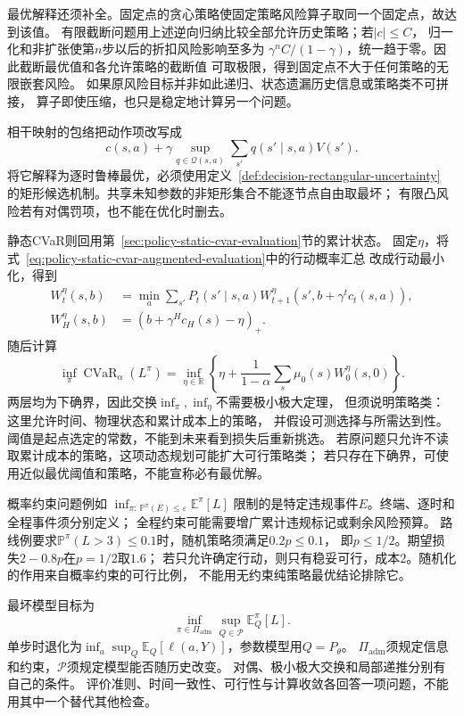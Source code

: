 最优解释还须补全。固定点的贪心策略使固定策略风险算子取同一个固定点，故达到该值。
有限截断问题用上述逆向归纳比较全部允许历史策略；若$|c|\leq C$，
归一化和非扩张使第$n$步以后的折扣风险影响至多为
$\gamma^nC/(1-\gamma)$，统一趋于零。因此截断最优值和各允许策略的截断值
可取极限，得到固定点不大于任何策略的无限嵌套风险。
如果原风险目标并非如此递归、状态遗漏历史信息或策略类不可拼接，
算子即使压缩，也只是稳定地计算另一个问题。

相干映射的包络把动作项改写成
\[
  c(s,a)+\gamma\sup_{q\in\mathcal Q(s,a)}
    \sum_{s'}q(s'\mid s,a)V(s').
\]
将它解释为逐时鲁棒最优，必须使用定义~\ref{def:decision-rectangular-uncertainty}
的矩形候选机制。共享未知参数的非矩形集合不能逐节点自由取最坏；
有限凸风险若有对偶罚项，也不能在优化时删去。

静态CVaR则回用第~\ref{sec:policy-static-cvar-evaluation}节的累计状态。
固定$\eta$，将式~\eqref{eq:policy-static-cvar-augmented-evaluation}中的行动概率汇总
改成行动最小化，得到
\[
  \begin{aligned}
    W_t^\eta(s,b)&=\min_a\sum_{s'}P_t(s'\mid s,a)
      W_{t+1}^\eta(s',b+\gamma^tc_t(s,a)),\\
    W_H^\eta(s,b)&=(b+\gamma^Hc_H(s)-\eta)_+.
  \end{aligned}
\]
随后计算
\[
  \inf_\pi\operatorname{CVaR}_\alpha(L^\pi)
  =\inf_{\eta\in\mathbb R}
    \left\{\eta+\frac{1}{1-\alpha}
      \sum_s\mu_0(s)W_0^\eta(s,0)\right\}.
\]
两层均为下确界，因此交换$\inf_\pi,\inf_\eta$不需要极小极大定理，
但须说明策略类：这里允许时间、物理状态和累计成本上的策略，
并假设可测选择与所需达到性。阈值是起点选定的常数，不能到未来看到损失后重新挑选。
若原问题只允许不读取累计成本的策略，这项动态规划可能扩大可行策略类；
若只存在下确界，可使用近似最优阈值和策略，不能宣称必有最优解。

概率约束问题例如
$\inf_{\pi:\,\mathbb P^\pi(E)\leq\varepsilon}\mathbb E^\pi[L]$
限制的是特定违规事件$E$。终端、逐时和全程事件须分别定义；
全程约束可能需要增广累计违规标记或剩余风险预算。
路线例要求$\mathbb P^\pi(L>3)\leq0.1$时，随机策略须满足$0.2p\leq0.1$，
即$p\leq1/2$。期望损失$2-0.8p$在$p=1/2$取$1.6$；
若只允许确定行动，则只有稳妥可行，成本$2$。随机化的作用来自概率约束的可行比例，
不能用无约束纯策略最优结论排除它。

最坏模型目标为
\[
  \inf_{\pi\in\Pi_{\mathrm{adm}}}
    \sup_{Q\in\mathcal P}\mathbb E_Q^\pi[L].
\]
单步时退化为$\inf_a\sup_Q\mathbb E_Q[\ell(a,Y)]$，参数模型用$Q=P_\theta$。
$\Pi_{\mathrm{adm}}$须规定信息和约束，$\mathcal P$须规定模型能否随历史改变。
对偶、极小极大交换和局部递推分别有自己的条件。
评价准则、时间一致性、可行性与计算收敛各回答一项问题，不能用其中一个替代其他检查。

